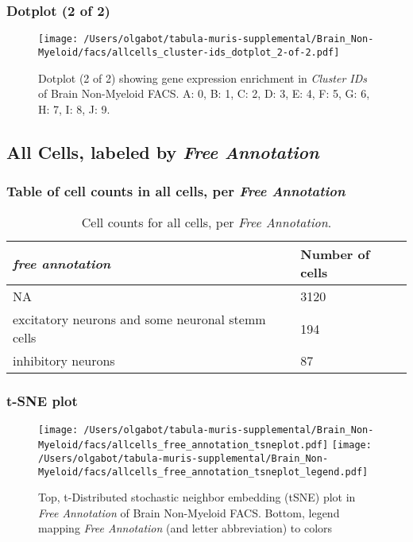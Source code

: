 \clearpage
\subsubsection{Dotplot (2 of 2)}
\begin{figure}[h]
\centering
\texttt{[image: /Users/olgabot/tabula-muris-supplemental/Brain\_Non-Myeloid/facs/allcells\_cluster-ids\_dotplot\_2-of-2.pdf]}

\caption{ Dotplot (2 of 2)  showing gene expression enrichment in \emph{Cluster IDs} of Brain Non-Myeloid FACS. A: 0, B: 1, C: 2, D: 3, E: 4, F: 5, G: 6, H: 7, I: 8, J: 9.}
\end{figure}


\clearpage
\subsection{All Cells, labeled by \emph{Free Annotation}}
\subsubsection{Table of cell counts in all cells, per \emph{Free Annotation}}\begin{table}[h]
\centering
\label{my-label}
\begin{tabular}{@{}ll@{}}
\toprule

\emph{free annotation}& Number of cells \\ \midrule
NA & 3120 \\

excitatory neurons and some neuronal stemm cells & 194 \\

inhibitory neurons & 87 \\
\bottomrule
\end{tabular}
\caption{Cell counts for all cells, per \emph{Free Annotation}.}
\end{table}

\clearpage
\subsubsection{t-SNE plot}
\begin{figure}[h]
\centering
\texttt{[image: /Users/olgabot/tabula-muris-supplemental/Brain\_Non-Myeloid/facs/allcells\_free\_annotation\_tsneplot.pdf]}
\texttt{[image: /Users/olgabot/tabula-muris-supplemental/Brain\_Non-Myeloid/facs/allcells\_free\_annotation\_tsneplot\_legend.pdf]}
\caption{Top, t-Distributed stochastic neighbor embedding (tSNE) plot  in \emph{Free Annotation} of Brain Non-Myeloid FACS. Bottom, legend mapping \emph{Free Annotation} (and letter abbreviation) to colors}
\end{figure}


